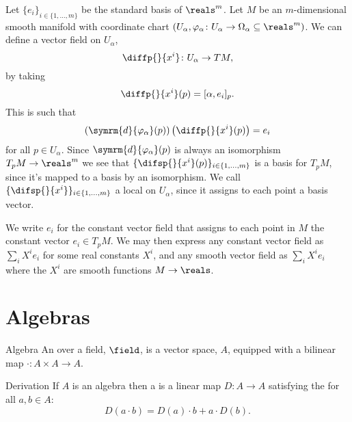 \documentclass[fleqn]{NotesClass}
\renewcommand{\dl}{\symrm{d}}
\begin{document}
    \begin{exm}{}{}
        Let \(\{e_i\}_{i \in \{1, \dotsc, m\}}\) be the standard basis of \(\reals^m\).
        Let \(M\) be an \(m\)-dimensional smooth manifold with coordinate chart \((U_\alpha, \varphi_\alpha \colon U_\alpha \to \Omega_\alpha \subseteq \reals^m)\).
        We can define a vector field on \(U_\alpha\),
        \begin{equation}
            \diffp{}{x^i} \colon U_\alpha \to TM,
        \end{equation}
        by taking
        \begin{equation}
            \diffp{}{x^i}(p) = [\alpha, e_i]_p.
        \end{equation}
        This is such that
        \begin{equation}
            (\dl{\varphi_\alpha}(p))\left( \diffp{}{x^i}(p) \right) = e_i
        \end{equation}
        for all \(p \in U_\alpha\).
        Since \(\dl{\varphi_\alpha}(p)\) is always an isomorphism \(T_pM \to \reals^m\) we see that \(\{\difsp{}{x^i}(p)\}_{i\in \{1, \dotsc, m\}}\) is a basis for \(T_pM\), since it's mapped to a basis by an isomorphism.
        We call \(\{\difsp{}{x^i}\}_{i \in \{1,\dotsc, m\}}\) a local  on \(U_\alpha\), since it assigns to each point a basis vector.
        
        We write \(e_i\) for the constant vector field that assigns to each point in \(M\) the constant vector \(e_i \in T_pM\).
        We may then express any constant vector field as \(\sum_i X^ie_i\) for some real constants \(X^i\), and any smooth vector field as \(\sum_i X^i e_i\) where the \(X^i\) are smooth functions \(M \to \reals\).
    \end{exm}
    
    \section{Algebras}
    \begin{dfn}{Algebra}{}
        An  over a field, \(\field\), is a vector space, \(A\), equipped with a bilinear map \(\cdot \colon A \times A \to A\).
    \end{dfn}
    
    \begin{dfn}{Derivation}{}
        If \(A\) is an algebra then a  is a linear map \(D \colon A \to A\) satisfying the  for all \(a, b \in A\):
        \begin{equation}
            D(a \cdot b) = D(a) \cdot b + a \cdot D(b).
        \end{equation}
    \end{dfn}
    
\end{document}
